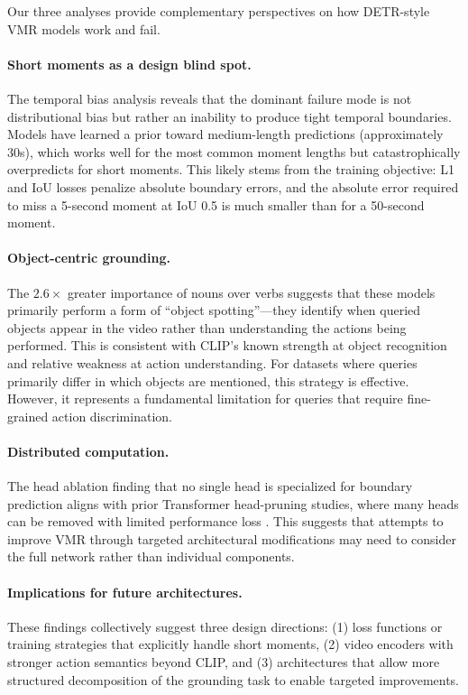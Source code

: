 \documentclass[10pt,twocolumn]{article}
\begin{document}
Our three analyses provide complementary perspectives on how DETR-style VMR models work and fail.

\paragraph{Short moments as a design blind spot.}
The temporal bias analysis reveals that the dominant failure mode is not distributional bias but rather an inability to produce tight temporal boundaries. Models have learned a prior toward medium-length predictions (approximately 30s), which works well for the most common moment lengths but catastrophically overpredicts for short moments. This likely stems from the training objective: L1 and IoU losses penalize absolute boundary errors, and the absolute error required to miss a 5-second moment at IoU 0.5 is much smaller than for a 50-second moment.

\paragraph{Object-centric grounding.}
The $2.6\times$ greater importance of nouns over verbs suggests that these models primarily perform a form of ``object spotting''---they identify when queried objects appear in the video rather than understanding the actions being performed. This is consistent with CLIP's known strength at object recognition and relative weakness at action understanding. For datasets where queries primarily differ in which objects are mentioned, this strategy is effective. However, it represents a fundamental limitation for queries that require fine-grained action discrimination.

\paragraph{Distributed computation.}
The head ablation finding that no single head is specialized for boundary prediction aligns with prior Transformer head-pruning studies, where many heads can be removed with limited performance loss \citep{voita2019analyzing,michel2019sixteen}. This suggests that attempts to improve VMR through targeted architectural modifications may need to consider the full network rather than individual components.

\paragraph{Implications for future architectures.}
These findings collectively suggest three design directions: (1) loss functions or training strategies that explicitly handle short moments, (2) video encoders with stronger action semantics beyond CLIP, and (3) architectures that allow more structured decomposition of the grounding task to enable targeted improvements.
\end{document}
